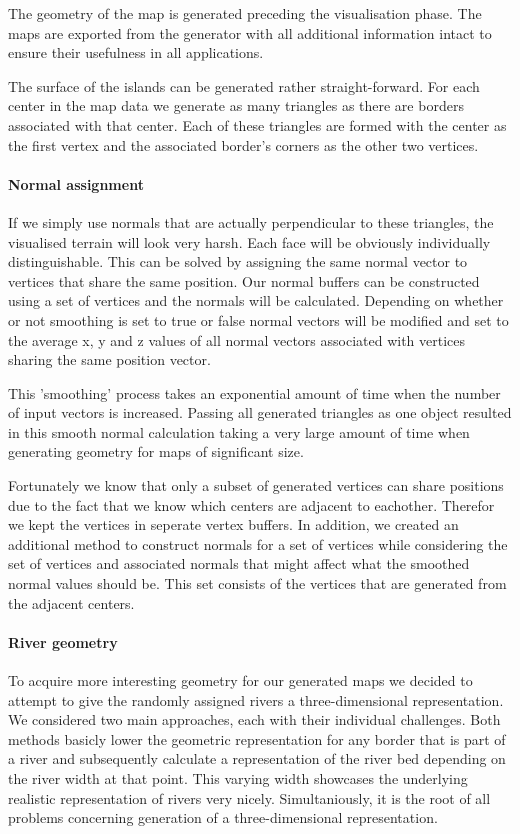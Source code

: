 The geometry of the map is generated preceding the visualisation phase. The maps are exported from the generator with all additional information intact to ensure their usefulness in all applications.

The surface of the islands can be generated rather straight-forward. For each center in the map data we generate as many triangles as there are borders associated with that center. Each of these triangles are formed with the center as the first vertex and the associated border's corners as the other two vertices.

\paragraph{Normal assignment}

If we simply use normals that are actually perpendicular to these triangles, the visualised terrain will look very harsh. Each face will be obviously individually distinguishable. This can be solved by assigning the same normal vector to vertices that share the same position. 
Our normal buffers can be constructed using a set of vertices and the normals will be calculated. Depending on whether or not smoothing is set to true or false normal vectors will be modified and set to the average x, y and z values of all normal vectors associated with vertices sharing the same position vector.

This 'smoothing' process takes an exponential amount of time when the number of input vectors is increased. Passing all generated triangles as one object resulted in this smooth normal calculation taking a very large amount of time when generating geometry for maps of significant size.

Fortunately we know that only a subset of generated vertices can share positions due to the fact that we know which centers are adjacent to eachother. Therefor we kept the vertices in seperate vertex buffers. In addition, we created an additional method to construct normals for a set of vertices while considering the set of vertices and associated normals that might affect what the smoothed normal values should be. This set consists of the vertices that are generated from the adjacent centers. 

\paragraph{River geometry}

To acquire more interesting geometry for our generated maps we decided to attempt to give the randomly assigned rivers a three-dimensional representation. We considered two main approaches, each with their individual challenges. Both methods basicly lower the geometric representation for any border that is part of a river and subsequently calculate a representation of the river bed depending on the river width at that point. This varying width showcases the underlying realistic representation of rivers very nicely. Simultaniously, it is the root of all problems concerning generation of a three-dimensional representation.

